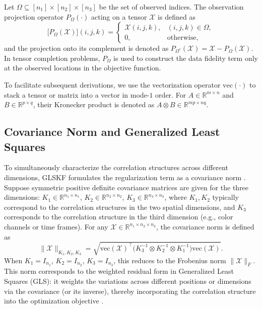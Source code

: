 \documentclass[a4paper,12pt]{article}
\numberwithin{equation}{section}
\numberwithin{algorithm}{section}
\theoremstyle{remark}
\theoremstyle{definition}
\begin{document}
Let $\Omega\subseteq [n_1]\times[n_2]\times[n_3]$ be the set of observed indices. The observation projection operator $P_{\Omega}(\cdot)$ acting on a tensor $\mathcal{X}$ is defined as
\[
\big[P_{\Omega}(\mathcal{X})\big](i,j,k)=
\begin{cases}
	\mathcal{X}(i,j,k), & (i,j,k)\in\Omega,\\
	0, & \text{otherwise},
\end{cases}
\]
and the projection onto its complement is denoted as $P_{\Omega^c}(\mathcal{X})=\mathcal{X}-P_{\Omega}(\mathcal{X})$. In tensor completion problems, $P_{\Omega}$ is used to construct the data fidelity term only at the observed locations in the objective function.

To facilitate subsequent derivations, we use the vectorization operator $\mathrm{vec}(\cdot)$ to stack a tensor or matrix into a vector in mode-$1$ order. For $A\in\mathbb{R}^{m\times n}$ and $B\in\mathbb{R}^{p\times q}$, their Kronecker product is denoted as $A\otimes B\in\mathbb{R}^{mp\times nq}$.






\subsection{Covariance Norm and Generalized Least Squares}
To simultaneously characterize the correlation structures across different dimensions, GLSKF formulates the regularization term as a covariance norm \cite{lei2024glskf}. Suppose symmetric positive definite covariance matrices are given for the three dimensions:
$K_1\in\mathbb{R}^{n_1\times n_1}$, $K_2\in\mathbb{R}^{n_2\times n_2}$, $K_3\in\mathbb{R}^{n_3\times n_3}$,
where $K_1, K_2$ typically correspond to the correlation structures in the two spatial dimensions, and $K_3$ corresponds to the correlation structure in the third dimension (e.g., color channels or time frames).
For any $\mathcal{X}\in\mathbb{R}^{n_1\times n_2\times n_3}$, the covariance norm is defined as
\begin{equation*}
	\|\mathcal{X}\|_{K_1,K_2,K_3}
	=\sqrt{ \mathrm{vec}(\mathcal{X})^{\top}\big(K_3^{-1}\otimes K_2^{-1}\otimes K_1^{-1}\big)\mathrm{vec}(\mathcal{X})}.
\end{equation*}
When $K_1=I_{n_1}$, $K_2=I_{n_2}$, $K_3=I_{n_3}$, this reduces to the Frobenius norm $\|\mathcal{X}\|_F$.
This norm corresponds to the weighted residual form in Generalized Least Squares (GLS): it weights the variations across different positions or dimensions via the covariance (or its inverse), thereby incorporating the correlation structure into the optimization objective \cite{allen2014glsmd}.
\end{document}
